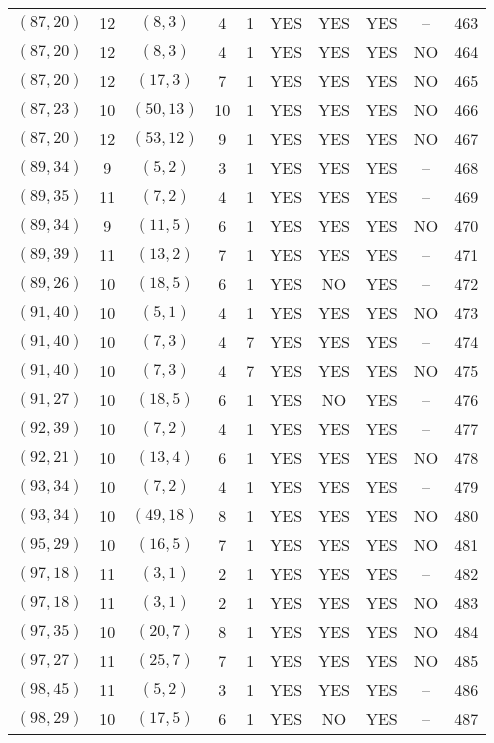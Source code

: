 \begin{longtable}{|c|c|c|c|c|c|c|c|c|c|}
$(87, 20)$ & 12 & $(8, 3)$ & 4 & 1 & YES & YES & YES & -- & 463\\
$(87, 20)$ & 12 & $(8, 3)$ & 4 & 1 & YES & YES & YES & NO & 464\\
$(87, 20)$ & 12 & $(17, 3)$ & 7 & 1 & YES & YES & YES & NO & 465\\
$(87, 23)$ & 10 & $(50, 13)$ & 10 & 1 & YES & YES & YES & NO & 466\\
$(87, 20)$ & 12 & $(53, 12)$ & 9 & 1 & YES & YES & YES & NO & 467\\
$(89, 34)$ & 9 & $(5, 2)$ & 3 & 1 & YES & YES & YES & -- & 468\\
$(89, 35)$ & 11 & $(7, 2)$ & 4 & 1 & YES & YES & YES & -- & 469\\
$(89, 34)$ & 9 & $(11, 5)$ & 6 & 1 & YES & YES & YES & NO & 470\\
$(89, 39)$ & 11 & $(13, 2)$ & 7 & 1 & YES & YES & YES & -- & 471\\
$(89, 26)$ & 10 & $(18, 5)$ & 6 & 1 & YES & NO & YES & -- & 472\\
$(91, 40)$ & 10 & $(5, 1)$ & 4 & 1 & YES & YES & YES & NO & 473\\
$(91, 40)$ & 10 & $(7, 3)$ & 4 & 7 & YES & YES & YES & -- & 474\\
$(91, 40)$ & 10 & $(7, 3)$ & 4 & 7 & YES & YES & YES & NO & 475\\
$(91, 27)$ & 10 & $(18, 5)$ & 6 & 1 & YES & NO & YES & -- & 476\\
$(92, 39)$ & 10 & $(7, 2)$ & 4 & 1 & YES & YES & YES & -- & 477\\
$(92, 21)$ & 10 & $(13, 4)$ & 6 & 1 & YES & YES & YES & NO & 478\\
$(93, 34)$ & 10 & $(7, 2)$ & 4 & 1 & YES & YES & YES & -- & 479\\
$(93, 34)$ & 10 & $(49, 18)$ & 8 & 1 & YES & YES & YES & NO & 480\\
$(95, 29)$ & 10 & $(16, 5)$ & 7 & 1 & YES & YES & YES & NO & 481\\
$(97, 18)$ & 11 & $(3, 1)$ & 2 & 1 & YES & YES & YES & -- & 482\\
$(97, 18)$ & 11 & $(3, 1)$ & 2 & 1 & YES & YES & YES & NO & 483\\
$(97, 35)$ & 10 & $(20, 7)$ & 8 & 1 & YES & YES & YES & NO & 484\\
$(97, 27)$ & 11 & $(25, 7)$ & 7 & 1 & YES & YES & YES & NO & 485\\
$(98, 45)$ & 11 & $(5, 2)$ & 3 & 1 & YES & YES & YES & -- & 486\\
$(98, 29)$ & 10 & $(17, 5)$ & 6 & 1 & YES & NO & YES & -- & 487\\

\end{longtable}
